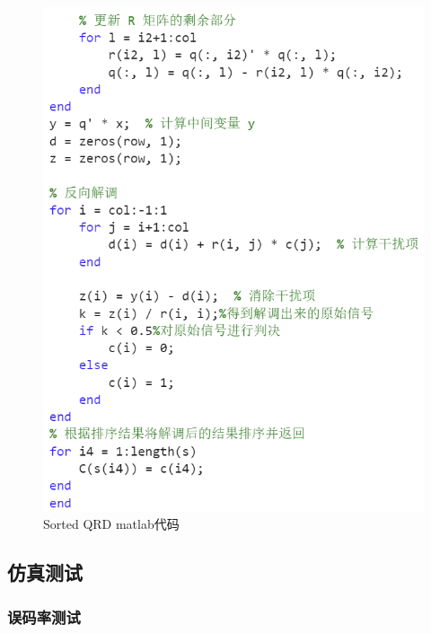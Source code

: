 \documentclass[a4paper,12pt]{article}
\begin{document}
\begin{figure}
\begin{minipage}{0.4\textwidth}
			\includegraphics[width=\textwidth]{7.png}
		\end{minipage}
		\caption{Sorted QRD matlab代码}
	\end{figure}
	\newpage
	\subsection{仿真测试}
	\subsubsection{误码率测试}
\end{document}
